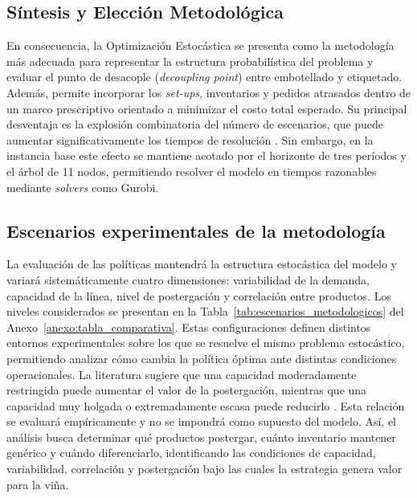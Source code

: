 \subsection{Síntesis y Elección Metodológica}

En consecuencia, la Optimización Estocástica se presenta como la metodología más adecuada para representar la estructura probabilística del problema y evaluar el punto de desacople (\textit{decoupling point}) entre embotellado y etiquetado. Además, permite incorporar los \textit{set-ups}, inventarios y pedidos atrasados dentro de un marco prescriptivo orientado a minimizar el costo total esperado. Su principal desventaja es la explosión combinatoria del número de escenarios, que puede aumentar significativamente los tiempos de resolución
\cite{gupta2000two}. Sin embargo, en la instancia base este efecto se mantiene acotado por el horizonte de tres períodos y el árbol de 11 nodos, permitiendo resolver el modelo en tiempos razonables mediante \textit{solvers} como Gurobi.


\subsection{Escenarios experimentales de la metodología}

La evaluación de las políticas mantendrá la estructura estocástica del modelo y variará sistemáticamente cuatro dimensiones: variabilidad de la demanda, capacidad de la línea, nivel de postergación y correlación entre productos. Los niveles considerados se presentan en la
Tabla~\ref{tab:escenarios_metodologicos} del
Anexo~\ref{anexo:tabla_comparativa}. Estas configuraciones definen distintos entornos experimentales sobre los que se resuelve el mismo problema estocástico, permitiendo analizar cómo cambia la política óptima ante distintas condiciones operacionales. La literatura sugiere que una capacidad moderadamente restringida puede aumentar el valor de la postergación, mientras que una capacidad muy holgada o extremadamente escasa puede reducirlo \cite{varas2018}. Esta relación se evaluará empíricamente y no se impondrá como supuesto del modelo. Así, el análisis busca determinar qué productos postergar, cuánto inventario mantener genérico y cuándo diferenciarlo, identificando las condiciones de capacidad, variabilidad, correlación y postergación bajo las cuales la estrategia genera valor para la viña.